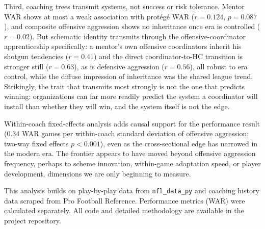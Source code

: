 \documentclass[USenglish]{article}
\theoremstyle{dgthm}
\theoremstyle{dgdef}
\begin{document}
Third, coaching trees transmit systems, not success or risk tolerance. Mentor WAR shows at most a weak association with prot\'{e}g\'{e} WAR ($r=0.124$, $p=0.087$), and composite offensive aggression shows no inheritance once era is controlled ($r=0.02$). But schematic identity transmits through the offensive-coordinator apprenticeship specifically: a mentor's own offensive coordinators inherit his shotgun tendencies ($r=0.41$) and the direct coordinator-to-HC transition is stronger still ($r=0.63$), as is defensive aggression ($r=0.56$), all robust to era control, while the diffuse impression of inheritance was the shared league trend. Strikingly, the trait that transmits most strongly is not the one that predicts winning: organizations can far more readily predict the system a coordinator will install than whether they will win, and the system itself is not the edge.

Within-coach fixed-effects analysis adds causal support for the performance result (0.34 WAR games per within-coach standard deviation of offensive aggression; two-way fixed effects $p<0.001$), even as the cross-sectional edge has narrowed in the modern era. The frontier appears to have moved beyond offensive aggression frequency, perhaps to scheme innovation, within-game adaptation speed, or player development, dimensions we are only beginning to measure.

\begin{acknowledgement}
  This analysis builds on play-by-play data from \texttt{nfl\_data\_py} and coaching history data scraped from Pro Football Reference. Performance metrics (WAR) were calculated separately. All code and detailed methodology are available in the project repository.
\end{acknowledgement}
\end{document}
